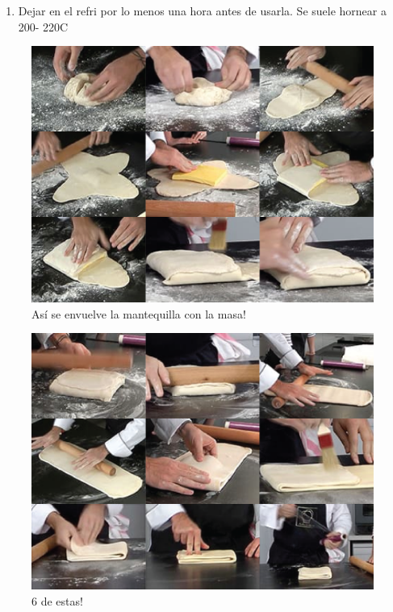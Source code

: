 \begin{enumerate}
\begin{itemize}
\item Girar 90\deg y doblar en 3 (4 la última vez, haciendo primero dos dobleces al centro). El giro y el doblez tiene que ser siempre en el mismo orden --e.g. giro en sentido horario, doblar la derecha primero, izquierda después--, de tal manera que una orilla no sea siempre la que quede al último. Cada vez que se hace un doblez remover la harina con una brocha. 
\item Envolver en plástico y dejar en el refrigerador por lo menos 30 min. Si la mantequilla se está saliendo entonces es necesario dejar enfriar una hora o más.
\end{itemize}
\item Dejar en el refri por lo menos una hora antes de usarla. Se suele hornear a 200\deg - 220\deg C
\end{enumerate}

\begin{figure}
\centering
\includegraphics[width=.8\textwidth]{recetas/hojaldre/figures/envoltura.png}
\caption{Así se envuelve la mantequilla con la masa!}
\label{fig:envoltura-hojaldre}
\end{figure}

\begin{figure}
\centering
\includegraphics[width=.8\textwidth]{recetas/hojaldre/figures/doblado.png}
\caption{6 de estas!}
\label{fig:doblado-hojaldre}
\end{figure}